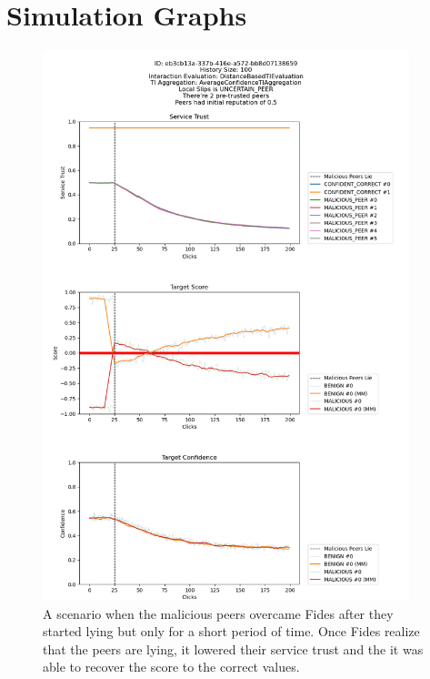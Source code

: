 \appendix
\chapter{Simulation Graphs}

\begin{figure}
    \centering
    \includegraphics[width=0.95\textwidth]{assets/miss_classification_recovery.png}
    \caption{A scenario when the malicious peers overcame Fides after they started lying but only for a short period of time. Once Fides realize that the peers are lying, it lowered their service trust and the it was able to recover the score to the correct values.}
    \label{fig:missclassification-recovery}
\end{figure}

